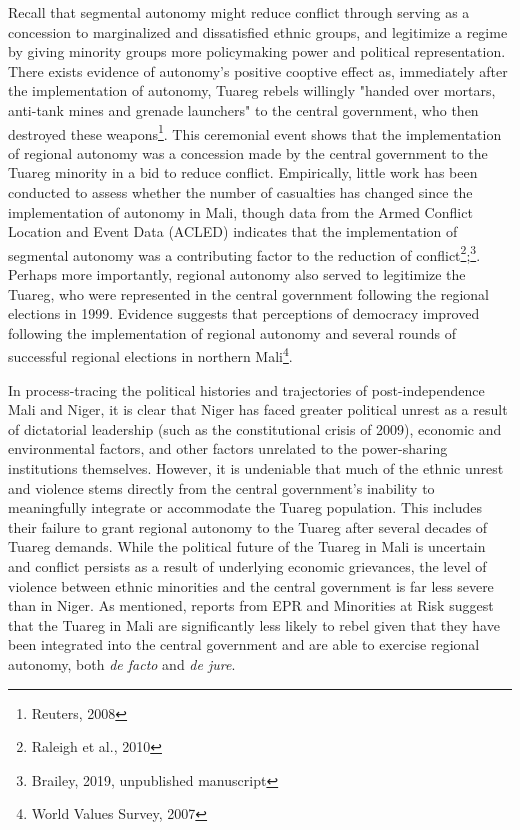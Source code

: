 \documentclass[12pt]{article}
\begin{document}
Recall that segmental autonomy might reduce conflict through serving as a concession to marginalized and dissatisfied ethnic groups, and legitimize a regime by giving minority groups more policymaking power and political representation. There exists evidence of autonomy's positive cooptive effect as, immediately after the implementation of autonomy, Tuareg rebels willingly "handed over mortars, anti-tank mines and grenade launchers" to the central government, who then destroyed these weapons\footnote{Reuters, 2008}. This ceremonial event shows that the implementation of regional autonomy was a concession made by the central government to the Tuareg minority in a bid to reduce conflict. Empirically, little work has been conducted to assess whether the number of casualties has changed since the implementation of autonomy in Mali, though data from the Armed Conflict Location and Event Data (ACLED) indicates that the implementation of segmental autonomy was a contributing factor to the reduction of conflict\footnote{Raleigh et al., 2010};\footnote{Brailey, 2019, unpublished manuscript}. Perhaps more importantly, regional autonomy also served to legitimize the Tuareg, who were represented in the central government following the regional elections in 1999. Evidence suggests that perceptions of democracy improved following the implementation of regional autonomy and several rounds of successful regional elections in northern Mali\footnote{World Values Survey, 2007}.

In process-tracing the political histories and trajectories of post-independence Mali and Niger, it is clear that Niger has faced greater political unrest as a result of dictatorial leadership (such as the constitutional crisis of 2009), economic and environmental factors, and other factors unrelated to the power-sharing institutions themselves. However, it is undeniable that much of the ethnic unrest and violence stems directly from the central government's inability to meaningfully integrate or accommodate the Tuareg population. This includes their failure to grant regional autonomy to the Tuareg after several decades of Tuareg demands. While the political future of the Tuareg in Mali is uncertain and conflict persists as a result of underlying economic grievances, the level of violence between ethnic minorities and the central government is far less severe than in Niger. As mentioned, reports from EPR and Minorities at Risk suggest that the Tuareg in Mali are significantly less likely to rebel given that they have been integrated into the central government and are able to exercise regional autonomy, both \textit{de facto} and \textit{de jure}. 
\end{document}
